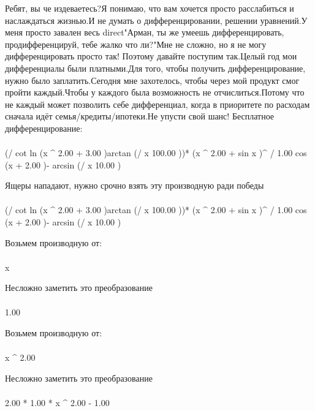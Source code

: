 Ребят, вы че издеваетесь?Я понимаю, что вам хочется просто расслабиться и наслаждаться жизнью.И не думать о дифференцировании, решении уравнений.У меня просто завален весь direct"Арман, ты же умеешь дифференцировать, продифференцируй, тебе жалко что ли?"Мне не сложно, но я не могу дифференцировать просто так! Поэтому давайте поступим так.Целый год мои дифференциалы были платными.Для того, чтобы получить дифференцирование, нужно было заплатить.Сегодня мне захотелось, чтобы через мой продукт смог пройти каждый.Чтобы у каждого была возможность не отчислиться.Потому что не каждый может позволить себе дифференциал, когда в приоритете по расходам сначала идёт семья/кредиты/ипотеки.Не упусти свой шанс! Бесплатное дифференцирование: 
\begin{gather}
\end{gather}
\begin{}
(/ {cot ln (x ^ {2.00 }+ 3.00 )}{arctan (/ {x }{100.00 })})* (x ^ {2.00 }+ sin x )^ {/ {1.00 }{cos (x + 2.00 )}- arcsin (/ {x }{10.00 })}\\
\end{}
Ящеры нападают, нужно срочно взять эту производную ради победы
\begin{gather}
\end{gather}
\begin{}
(/ {cot ln (x ^ {2.00 }+ 3.00 )}{arctan (/ {x }{100.00 })})* (x ^ {2.00 }+ sin x )^ {/ {1.00 }{cos (x + 2.00 )}- arcsin (/ {x }{10.00 })}\\
\end{}
Возьмем производную от:
\begin{gather}
\end{gather}
\begin{}
x \\
\end{}
Несложно заметить это преобразование
\begin{gather}
\end{gather}
\begin{}
1.00 \\
\end{}
Возьмем производную от:
\begin{gather}
\end{gather}
\begin{}
x ^ {2.00 }\\
\end{}
Несложно заметить это преобразование
\begin{gather}
\end{gather}
\begin{}
2.00 * 1.00 * x ^ {2.00 - 1.00 }\\
\end{}
